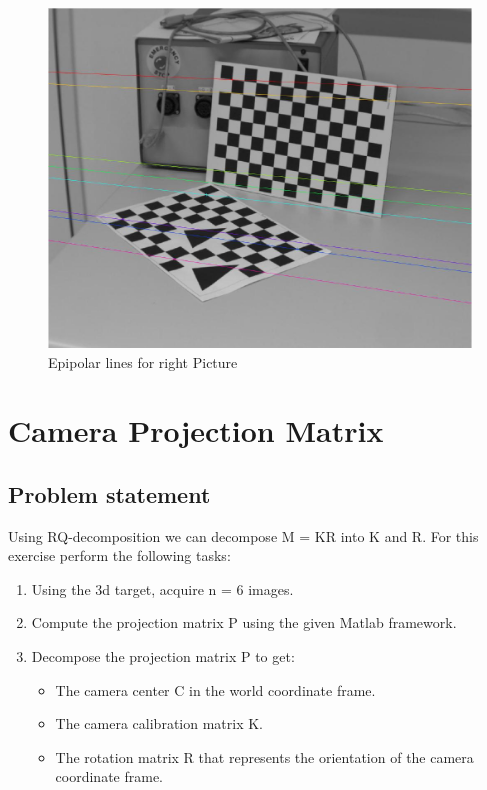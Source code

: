\documentclass[
a4paper,     %
11pt         %
]{scrartcl}  %
\begin{document}
\begin{figure}
 \centering
 \includegraphics[scale=0.4]{right_lines.jpg}
 \caption{Epipolar lines for right Picture}
 \label{fig:right_lines}
\end{figure}


\section{Camera Projection Matrix}

\subsection{Problem statement}

Using RQ-decomposition we can decompose M = KR into K and R.
For this exercise perform the following tasks:

\begin{enumerate}
 \item Using the 3d target, acquire n = 6 images.
 \item Compute the projection matrix P using the given Matlab framework.
 \item Decompose the projection matrix P to get:
 \begin{itemize}
  \item The camera center C in the world coordinate frame.
  \item The camera calibration matrix K.
  \item The rotation matrix R that represents the orientation of the camera coordinate frame.
 \end{itemize}

\end{enumerate}
\end{document}

